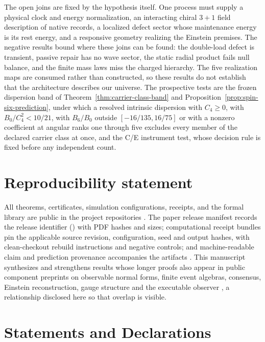 \documentclass[11pt]{article}
\theoremstyle{definition}
\theoremstyle{remark}
\begin{document}
The open joins are fixed by the hypothesis itself. One process must supply
a physical clock and energy normalization, an interacting chiral $3+1$ field
description of native records, a localized defect sector whose maintenance
energy is its rest energy, and a responsive geometry realizing the Einstein
premises. The negative results bound where these joins can be found: the
double-load defect is transient, passive repair has no wave sector, the
static radial product fails null balance, and the finite mass laws miss the
charged hierarchy. The five realization maps are consumed rather than
constructed, so these results do not establish that the architecture
describes our universe. The prospective tests are the frozen dispersion band
of Theorem~\ref{thm:carrier-class-band} and
Proposition~\ref{prop:spin-six-prediction}, under which a resolved intrinsic
dispersion with $C_4\ge0$, with $B_0/C_4^2<10/21$, with $B_6/B_0$ outside
$[-16/135,16/75]$ or with a nonzero coefficient at angular ranks one through
five excludes every member of the declared carrier class at once, and the
C/E instrument test, whose decision rule is fixed before any independent
count.

\section*{Reproducibility statement}

All theorems, certificates, simulation configurations, receipts, and the
formal library are public in the project repositories \cite{ophrepo,ophsim}.
The paper release manifest records the release identifier
(\OPHPaperReleaseID) with PDF hashes and sizes; computational receipt bundles
pin the applicable source revision, configuration, seed and output hashes,
with clean-checkout rebuild instructions and negative controls; and
machine-readable claim and prediction provenance accompanies the artifacts
\cite{ophregister}. This manuscript synthesizes and strengthens results whose
longer proofs also appear in public component preprints on observable normal
forms, finite event algebras, consensus, Einstein reconstruction, gauge
structure and the executable observer
\cite{ophnormalforms,opheventalgebra,ophconsensus,ophEinstein,ophGauge,ophspine},
a relationship disclosed here so that overlap is visible.

\section*{Statements and Declarations}
\end{document}
